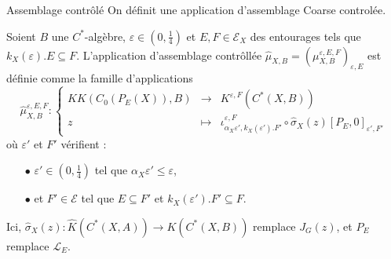 \begin{frame}{Assemblage contrôlé}
On définit une application d'assemblage Coarse controlée. 
\begin{definitionfr}
Soient $B$ une $C^*$-algèbre, $\varepsilon\in (0,\frac{1}{4})$ et $E,F\in\mathcal E_X$ des entourages tels que $k_X(\varepsilon).E\subseteq F$. L'application d'assemblage contrôllée $\hat\mu_{X,B}=(\mu_{X,B}^{\varepsilon,E,F})_{\varepsilon,E}$ est définie comme la famille d'applications
\[\hat\mu_{X,B}^{\varepsilon, E,F} :\left\{\begin{array}{rcl} KK(C_0(P_E(X)),B) & \rightarrow & K^{\varepsilon, F}(C^*(X,B)) \\
					z & \mapsto & \iota_{\alpha_X \varepsilon',k_X(\varepsilon').F'}^{\varepsilon,F}\circ\hat\sigma_X(z)[P_{E},0]_{\varepsilon', F'}\end{array}\right.\]
où $\varepsilon'$ et $F'$ vérifient :
\begin{itemize}
\item[$\bullet$] $\varepsilon'\in (0,\frac{1}{4})$ tel que $\alpha_X \varepsilon'\leq \varepsilon$,
\item[$\bullet$] et $F'\in\mathcal E$ tel que $E\subseteq F'$ et $k_X(\varepsilon').F'\subseteq F$.
\end{itemize}
\end{definitionfr}
\vspace{0.3 cm}
Ici, $\hat\sigma_X(z): \hat K(C^*(X,A)) \rightarrow K(C^*(X,B)) $ remplace $J_G(z)$, et $P_E$ remplace $\mathcal L_E$.\end{frame}
